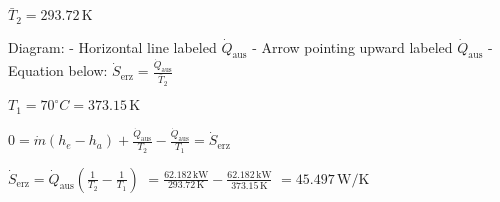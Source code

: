 \( \bar{T}_2 = 293.72 \, \text{K} \)  

Diagram:  
- Horizontal line labeled \( \dot{Q}_{\text{aus}} \)  
- Arrow pointing upward labeled \( \dot{Q}_{\text{aus}} \)  
- Equation below: \( \dot{S}_{\text{erz}} = \frac{\dot{Q}_{\text{aus}}}{\bar{T}_2} \)  

\( T_1 = 70^\circ C = 373.15 \, \text{K} \)  

\( 0 = \dot{m}(h_e - h_a) + \frac{\dot{Q}_{\text{aus}}}{T_2} - \frac{\dot{Q}_{\text{aus}}}{T_1} = \dot{S}_{\text{erz}} \)  

\( \dot{S}_{\text{erz}} = \dot{Q}_{\text{aus}} \left(\frac{1}{T_2} - \frac{1}{T_1}\right) \)  
\( = \frac{62.182 \, \text{kW}}{293.72 \, \text{K}} - \frac{62.182 \, \text{kW}}{373.15 \, \text{K}} \)  
\( = 45.497 \, \text{W/K} \)